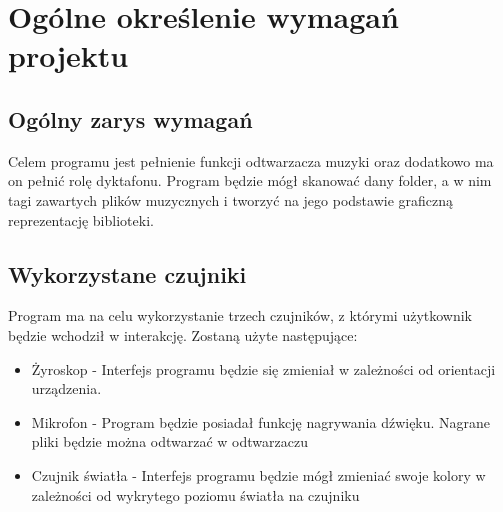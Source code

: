 	\newpage
\section{Ogólne określenie wymagań projektu}		%

\subsection{Ogólny zarys wymagań}

Celem programu jest pełnienie funkcji odtwarzacza muzyki oraz dodatkowo ma on pełnić rolę dyktafonu. Program będzie mógł skanować dany folder, a w nim tagi zawartych plików muzycznych i tworzyć na jego podstawie graficzną reprezentację biblioteki. 

\subsection{Wykorzystane czujniki}

Program ma na celu wykorzystanie trzech czujników, z którymi użytkownik będzie wchodził w interakcję. Zostaną użyte następujące:

\begin{itemize}
	\item Żyroskop - Interfejs programu będzie się zmieniał w zależności od orientacji urządzenia. 
	
	\item Mikrofon - Program będzie posiadał funkcję nagrywania dźwięku. Nagrane pliki będzie można odtwarzać w odtwarzaczu

	\item Czujnik światła - Interfejs programu będzie mógł zmieniać swoje kolory w zależności od wykrytego poziomu światła na czujniku
\end{itemize}
